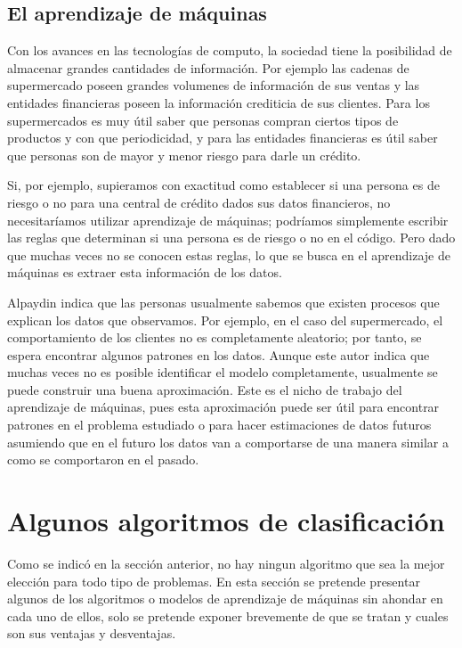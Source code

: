 \documentclass[a4paper, 11pt, oneside]{report}
\begin{document}
\subsection{El aprendizaje de máquinas}
\label{sect:machineLearning}

Con los avances en las tecnologías de computo, la sociedad tiene la posibilidad de almacenar grandes cantidades de información. Por ejemplo las cadenas de supermercado poseen grandes volumenes de información de sus ventas y las entidades financieras poseen la información crediticia de sus clientes. Para los supermercados es muy útil saber que personas compran ciertos tipos de productos y con que periodicidad, y para las entidades financieras es útil saber que personas son de mayor y menor riesgo para darle un crédito.\newline

Si, por ejemplo, supieramos con exactitud como establecer si una persona es de riesgo o no para una central de crédito dados sus datos financieros, no necesitaríamos utilizar
aprendizaje de máquinas; podríamos simplemente escribir las reglas que determinan si una persona es de riesgo o no en el código. Pero dado que muchas veces no se conocen estas reglas, lo que se busca en el aprendizaje de máquinas es extraer esta información de los datos.

Alpaydin indica que las personas usualmente sabemos que existen procesos que explican los datos que observamos. Por ejemplo, en el caso del supermercado, el comportamiento de los clientes no es completamente aleatorio; por tanto, se espera encontrar algunos patrones en los datos. Aunque este autor indica que muchas veces no es posible identificar el modelo completamente, usualmente se puede construir una buena aproximación. Este es el nicho de trabajo del aprendizaje de máquinas, pues esta aproximación puede ser útil para encontrar patrones en el problema estudiado o para hacer estimaciones de datos futuros asumiendo que en el futuro los datos van a comportarse de una manera similar a como se comportaron en el pasado.

\section{Algunos algoritmos de clasificación}

Como se indicó en la sección anterior, no hay ningun algoritmo que sea la mejor elección para todo tipo de problemas. En esta sección se pretende presentar algunos de los algoritmos o modelos de aprendizaje de máquinas sin ahondar en cada uno de ellos, solo se pretende exponer brevemente de que se tratan y cuales son sus ventajas y desventajas.
\end{document}
